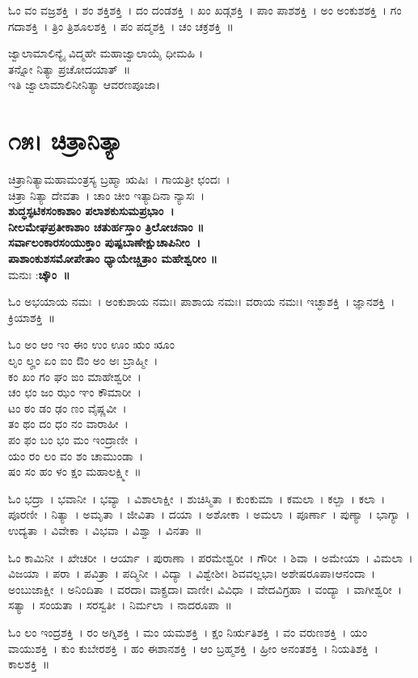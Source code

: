 ಓಂ ವಂ ವಜ್ರಶಕ್ತಿ~।  ಶಂ ಶಕ್ತಿಶಕ್ತಿ~।  ದಂ ದಂಡಶಕ್ತಿ~।  ಖಂ ಖಡ್ಗಶಕ್ತಿ~।  ಪಾಂ ಪಾಶಶಕ್ತಿ~।  ಅಂ ಅಂಕುಶಶಕ್ತಿ~।  ಗಂ ಗದಾಶಕ್ತಿ~।  ತ್ರಿಂ ತ್ರಿಶೂಲಶಕ್ತಿ~।  ಪಂ ಪದ್ಮಶಕ್ತಿ~।  ಚಂ ಚಕ್ರಶಕ್ತಿ~॥

ಜ್ವಾಲಾಮಾಲಿನ್ಯೈ ವಿದ್ಮಹೇ ಮಹಾಜ್ವಾಲಾಯೈ ಧೀಮಹಿ ।\\ತನ್ನೋ ನಿತ್ಯಾ ಪ್ರಚೋದಯಾತ್~॥\\
ಇತಿ ಜ್ವಾಲಾಮಾಲಿನೀನಿತ್ಯಾ ಆವರಣಪೂಜಾ।
\section{೧೫। ಚಿತ್ರಾನಿತ್ಯಾ}
ಚಿತ್ರಾನಿತ್ಯಾಮಹಾಮಂತ್ರಸ್ಯ ಬ್ರಹ್ಮಾ ಋಷಿಃ~। ಗಾಯತ್ರೀ ಛಂದಃ~। \\ಚಿತ್ರಾ ನಿತ್ಯಾ ದೇವತಾ~। ಚಾಂ ಚೀಂ ಇತ್ಯಾದಿನಾ ನ್ಯಾಸಃ~।\\
{\bfseries ಶುದ್ಧಸ್ಫಟಿಕಸಂಕಾಶಾಂ ಪಲಾಶಕುಸುಮಪ್ರಭಾಂ~।\\
ನೀಲಮೇಘಪ್ರತೀಕಾಶಾಂ ಚತುರ್ಹಸ್ತಾಂ ತ್ರಿಲೋಚನಾಂ ॥\\
ಸರ್ವಾಲಂಕಾರಸಂಯುಕ್ತಾಂ ಪುಷ್ಪಬಾಣೇಕ್ಷುಚಾಪಿನೀಂ~।\\
ಪಾಶಾಂಕುಶಸಮೋಪೇತಾಂ ಧ್ಯಾಯೇಚ್ಚಿತ್ರಾಂ ಮಹೇಶ್ವರೀಂ ॥\\}
ಮನುಃ :{\bfseries  ಚ್ಕೌಂ~॥}

ಓಂ ಅಭಯಾಯ ನಮಃ~।  ಅಂಕುಶಾಯ ನಮಃ।  ಪಾಶಾಯ ನಮಃ।  ವರಾಯ ನಮಃ।  ಇಚ್ಛಾಶಕ್ತಿ~।  ಜ್ಞಾನಶಕ್ತಿ~।  ಕ್ರಿಯಾಶಕ್ತಿ~॥ 

ಓಂ ಅಂ ಆಂ ಇಂ ಈಂ ಉಂ ಊಂ ಋಂ ೠಂ \\ಲೃಂ ಲೄಂ ಏಂ ಐಂ  ಔಂ ಅಂ ಅಃ ಬ್ರಾಹ್ಮೀ~।\\  ಕಂ ಖಂ ಗಂ ಘಂ ಙಂ ಮಾಹೇಶ್ವರೀ~।\\  ಚಂ ಛಂ ಜಂ ಝಂ ಞಂ ಕೌಮಾರೀ~।\\  ಟಂ ಠಂ ಡಂ ಢಂ ಣಂ ವೈಷ್ಣವೀ~। \\ತಂ ಥಂ ದಂ ಧಂ ನಂ ವಾರಾಹೀ~। \\ಪಂ ಫಂ ಬಂ ಭಂ ಮಂ ಇಂದ್ರಾಣೀ~। \\ ಯಂ ರಂ ಲಂ ವಂ ಶಂ ಚಾಮುಂಡಾ~। \\ ಷಂ ಸಂ ಹಂ ಳಂ ಕ್ಷಂ ಮಹಾಲಕ್ಷ್ಮೀ~॥ 

ಓಂ ಭದ್ರಾ~।  ಭವಾನೀ~।  ಭವ್ಯಾ~।  ವಿಶಾಲಾಕ್ಷೀ~।  ಶುಚಿಸ್ಮಿತಾ~।  ಕುಂಕುಮಾ~।  ಕಮಲಾ~।  ಕಲ್ಪಾ~।  ಕಲಾ~।  ಪೂರಣೀ~।  ನಿತ್ಯಾ~।  ಅಮೃತಾ~।  ಜೀವಿತಾ~।  ದಯಾ~।  ಅಶೋಕಾ~।  ಅಮಲಾ~।  ಪೂರ್ಣಾ~।  ಪುಣ್ಯಾ~।  ಭಾಗ್ಯಾ~।  ಉದ್ಯತಾ~।  ವಿವೇಕಾ~।  ವಿಭವಾ~।  ವಿಶ್ವಾ~।  ವಿನತಾ~॥ 

ಓಂ ಕಾಮಿನೀ~।  ಖೇಚರೀ~।  ಆರ್ಯಾ~।  ಪುರಾಣಾ~।  ಪರಮೇಶ್ವರೀ~।  ಗೌರೀ~।  ಶಿವಾ~।  ಅಮೇಯಾ~।  ವಿಮಲಾ~।  ವಿಜಯಾ~।  ಪರಾ~।  ಪವಿತ್ರಾ~।  ಪದ್ಮಿನೀ~।  ವಿದ್ಯಾ~।  ವಿಶ್ವೇಶೀ। ಶಿವವಲ್ಲಭಾ। ಅಶೇಷರೂಪಾ।ಆನಂದಾ~।  ಅಂಬುಜಾಕ್ಷೀ~।  ಅನಿಂದಿತಾ~।  ವರದಾ। ವಾಕ್ಪ್ರದಾ। ವಾಣೀ।  ವಿವಿಧಾ~।  ವೇದವಿಗ್ರಹಾ~।  ವಂದ್ಯಾ~।  ವಾಗೀಶ್ವರೀ~।  ಸತ್ಯಾ~।  ಸಂಯತಾ~।  ಸರಸ್ವತೀ~।  ನಿರ್ಮಲಾ~।  ನಾದರೂಪಾ~॥

ಓಂ ಲಂ ಇಂದ್ರಶಕ್ತಿ~।  ರಂ ಅಗ್ನಿಶಕ್ತಿ~।  ಮಂ ಯಮಶಕ್ತಿ~।  ಕ್ಷಂ ನಿರ್ಋತಿಶಕ್ತಿ~।  ವಂ ವರುಣಶಕ್ತಿ~।  ಯಂ ವಾಯುಶಕ್ತಿ~।  ಕುಂ ಕುಬೇರಶಕ್ತಿ~।  ಹಂ ಈಶಾನಶಕ್ತಿ~।  ಆಂ ಬ್ರಹ್ಮಶಕ್ತಿ~।  ಹ್ರೀಂ ಅನಂತಶಕ್ತಿ~।  ನಿಯತಿಶಕ್ತಿ~।  ಕಾಲಶಕ್ತಿ~॥

